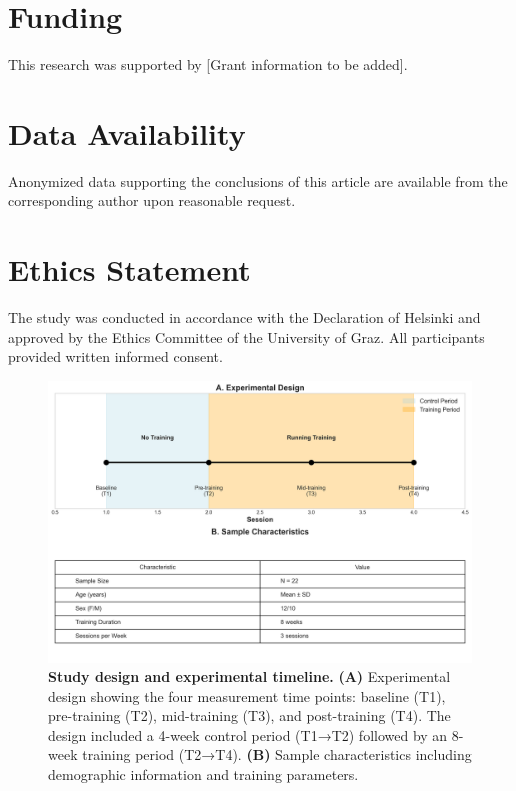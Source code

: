 \documentclass[12pt,a4paper]{article}
\begin{document}
\section*{Funding}

This research was supported by [Grant information to be added].

\section*{Data Availability}

Anonymized data supporting the conclusions of this article are available from the corresponding author upon reasonable request.

\section*{Ethics Statement}

The study was conducted in accordance with the Declaration of Helsinki and approved by the Ethics Committee of the University of Graz. All participants provided written informed consent.




\newpage

\begin{figure}[H]
\centering
\includegraphics[width=\textwidth]{comprehensive_results/Figure1_StudyDesign.png}
\caption{\textbf{Study design and experimental timeline.} \textbf{(A)} Experimental design showing the four measurement time points: baseline (T1), pre-training (T2), mid-training (T3), and post-training (T4). The design included a 4-week control period (T1→T2) followed by an 8-week training period (T2→T4). \textbf{(B)} Sample characteristics including demographic information and training parameters.}
\label{fig:study_design}
\end{figure}
\end{document}

